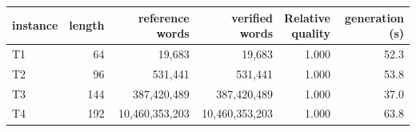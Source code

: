 \begin{center}\begin{minipage}{\linewidth}\centering\small
\begin{tabular}{@{}lrrrrr@{}}
\toprule
instance & length & reference words & verified words & \shortstack{Relative\\quality} & generation (s) \\
\midrule
T1 & 64 & 19,683 & 19,683 & 1.000 & 52.3 \\
T2 & 96 & 531,441 & 531,441 & 1.000 & 53.8 \\
T3 & 144 & 387,420,489 & 387,420,489 & 1.000 & 37.0 \\
T4 & 192 & 10,460,353,203 & 10,460,353,203 & 1.000 & 63.8 \\
\bottomrule
\end{tabular}
\label{tab:trifference_scaling}
\end{minipage}\end{center}
